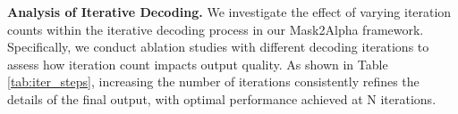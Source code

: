 \noindent
{\bf Analysis of Iterative Decoding.} We investigate the effect of varying iteration counts within the iterative decoding process in our Mask2Alpha framework. Specifically, we conduct ablation studies with different decoding iterations to assess how iteration count impacts output quality. As shown in Table \ref{tab:iter_steps}, increasing the number of iterations consistently refines the details of the final output, with optimal performance achieved at N iterations.


\begin{table}[t]
    \centering
    \vspace{-0.1in}
    \caption{Impact of Iteration Steps \( t \) on the Accuracy and Efficiency of Mask2Alpha.}
    \label{tab:iter_steps}
    \vspace{-0.1in}
\end{table}




